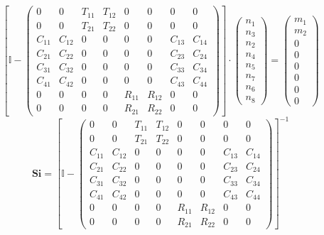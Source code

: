 \[ \left[ \mathbb{I}  - \left(\begin{smallmatrix} 0 & 0 & T_{11} &
T_{12} & 0 & 0 & 0 & 0 \\ 0 & 0 & T_{21} & T_{22} & 0 & 0 & 0 & 0 \\
C_{11} & C_{12} & 0 & 0 & 0 & 0 & C_{13} & C_{14} \\ C_{21} & C_{22} &
0 & 0 & 0 & 0 & C_{23} & C_{24} \\ C_{31} & C_{32} & 0 & 0 & 0 & 0 &
C_{33} & C_{34} \\ C_{41} & C_{42} & 0 & 0 & 0 & 0 & C_{43} & C_{44}
\\ 0 & 0 & 0 & 0 & R_{11} & R_{12} & 0 & 0 \\ 0 & 0 & 0 & 0 & R_{21} &
R_{22} & 0 & 0 \end{smallmatrix}\right)\right] \cdot
\left(\begin{smallmatrix} n_{1} \\ n_{3} \\ n_{2} \\ n_{4} \\ n_{5} \\
n_{7} \\ n_{6} \\ n_{8} \end{smallmatrix}\right) =
\left(\begin{smallmatrix} m_{1} \\ m_{2} \\ 0 \\ 0 \\ 0 \\ 0 \\ 0 \\ 0
\end{smallmatrix}\right) \]
\[ \mathbf{Si} = \left[ \mathbb{I}  - \left(\begin{smallmatrix} 0 & 0
& T_{11} & T_{12} & 0 & 0 & 0 & 0 \\ 0 & 0 & T_{21} & T_{22} & 0 & 0 &
0 & 0 \\ C_{11} & C_{12} & 0 & 0 & 0 & 0 & C_{13} & C_{14} \\ C_{21} &
C_{22} & 0 & 0 & 0 & 0 & C_{23} & C_{24} \\ C_{31} & C_{32} & 0 & 0 &
0 & 0 & C_{33} & C_{34} \\ C_{41} & C_{42} & 0 & 0 & 0 & 0 & C_{43} &
C_{44} \\ 0 & 0 & 0 & 0 & R_{11} & R_{12} & 0 & 0 \\ 0 & 0 & 0 & 0 &
R_{21} & R_{22} & 0 & 0 \end{smallmatrix}\right) \right]^{-1} \]

